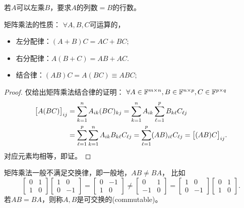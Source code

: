 \begin{remark}
	若$A$可以左乘$B$，要求$A$的列数$= B$的行数。
\end{remark}

\begin{corollary}
	矩阵乘法的性质：%
	$\forall A,B,C$可运算的，
    \begin{itemize}
        \item 左分配律：$(A + B)C = AC + BC;$
        \item 右分配律：$A(B + C) = AB + AC.$
        \item 结合律：$(AB)C = A(BC) \equiv ABC;$
    \end{itemize}
\end{corollary}

\begin{proof}
	仅给出矩阵乘法结合律的证明：
	$\forall A \in \mathbb{F}^{m\times n},B \in \mathbb{F}^{n\times p},C \in \mathbb{F}^{p\times q}$
	\begin{align*}
		\bigl[A(BC)\bigr]_{ij} &= \sum_{k=1}^nA_{ik}(BC)_{kj} = \sum_{k=1}^nA_{ik}\sum_{\ell=1}^pB_{k\ell}C_{\ell j}\\
		&= \sum_{\ell=1}^p\sum_{k=1}^nA_{ik}B_{k\ell}C_{\ell j} = \sum_{\ell=1}^p(AB)_{i\ell}C_{\ell j} = \bigl[(AB)C\bigr]_{ij}.
	\end{align*}
	对应元素均相等，即证。
\end{proof}

\begin{remark}
	矩阵乘法一般不满足交换律，即一般地，$AB \neq BA$，
	比如
	\[
		\begin{bmatrix}
			0&1\\1&0
		\end{bmatrix}\begin{bmatrix}
			1&0\\0&-1
		\end{bmatrix} = \begin{bmatrix}
			0&-1\\1&0
		\end{bmatrix} \neq \begin{bmatrix}
			0&1\\-1&0
		\end{bmatrix} = \begin{bmatrix}
			1&0\\0&-1
		\end{bmatrix}\begin{bmatrix}
			0&1\\1&0
		\end{bmatrix}.
	\]
	若$AB = BA$，则称$A,B$是可交换的(commutable)。
\end{remark}

